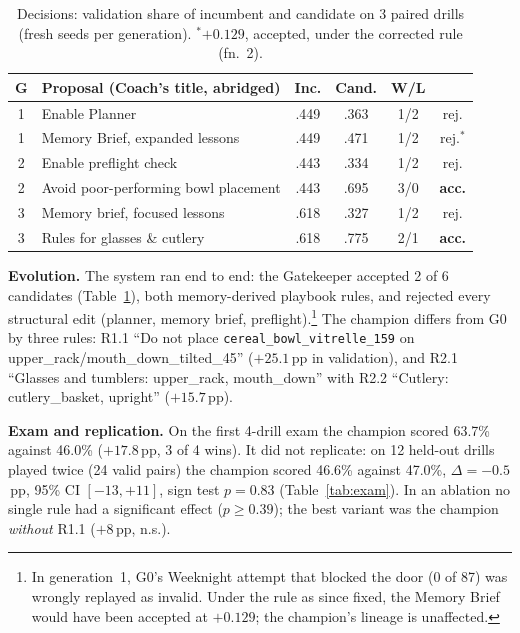 \documentclass[9pt,twocolumn,letterpaper]{extarticle}
\newcommand{\Accepted}{2}
\newcommand{\Proposed}{6}
\begin{document}
\begin{table}[t]
\centering\footnotesize
\setlength{\tabcolsep}{2.5pt}
\begin{tabular}{@{}clcccc@{}}
\toprule
G & Proposal (Coach's title, abridged) & Inc. & Cand. & W/L & \\
\midrule
1 & Enable Planner & .449 & .363 & 1/2 & rej. \\
1 & Memory Brief, expanded lessons & .449 & .471 & 1/2 & rej.$^\ast$ \\
2 & Enable preflight check & .443 & .334 & 1/2 & rej. \\
2 & Avoid poor-performing bowl placement & .443 & .695 & 3/0 & \textbf{acc.} \\
3 & Memory brief, focused lessons & .618 & .327 & 1/2 & rej. \\
3 & Rules for glasses \& cutlery & .618 & .775 & 2/1 & \textbf{acc.} \\
\bottomrule
\end{tabular}
\caption{Decisions: validation share of incumbent and candidate on 3 paired drills (fresh seeds
per generation). $^\ast$$+0.129$, accepted, under the corrected rule (fn.~2).}
\label{tab:decisions}
\end{table}

\textbf{Evolution.} The system ran end to end: the Gatekeeper accepted \Accepted{} of \Proposed{}
candidates (Table~\ref{tab:decisions}), both memory-derived playbook rules, and rejected every
structural edit (planner, memory brief, preflight).\footnote{In generation~1, G0's Weeknight attempt
that blocked the door (0 of 87) was wrongly replayed as invalid. Under the rule as since fixed, the
Memory Brief would have been accepted at $+0.129$; the champion's lineage is unaffected.} The
champion differs from G0 by three rules: R1.1 ``Do not place \texttt{cereal\_bowl\_vitrelle\_159} on
upper\_rack/mouth\_down\_tilted\_45'' ($+25.1$\,pp in validation), and R2.1 ``Glasses and tumblers:
upper\_rack, mouth\_down'' with R2.2 ``Cutlery: cutlery\_basket, upright'' ($+15.7$\,pp).

\textbf{Exam and replication.} On the first 4-drill exam the champion scored 63.7\% against 46.0\%
($+17.8$\,pp, 3 of 4 wins). It did not replicate: on 12 held-out drills played twice (24 valid
pairs) the champion scored 46.6\% against 47.0\%, $\Delta=-0.5$\,pp, 95\% CI $[-13,+11]$, sign
test $p=0.83$ (Table~\ref{tab:exam}). In an ablation no single rule had a significant effect ($p\ge0.39$); the best variant was the champion \emph{without} R1.1 ($+8$\,pp, n.s.).
\end{document}
